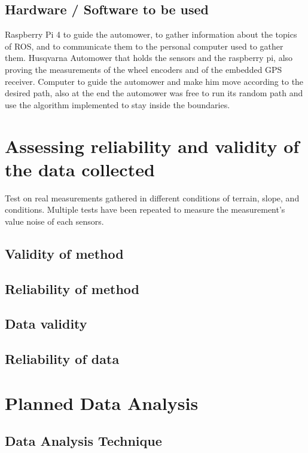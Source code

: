 \subsection{Hardware / Software to be used}
Raspberry Pi 4 to guide the automower, to gather information about the topics of ROS, and to communicate them to the personal computer used to gather them.
Husqvarna Automower that holds the sensors and the raspberry pi, also proving the measurements of the wheel encoders and of the embedded GPS receiver. 
Computer to guide the automower and make him move according to the desired path, also at the end the automower was free to run its random path and use the algorithm implemented to stay inside the boundaries.


\section{Assessing reliability and validity of the data collected}
\label{sec:assessingReliability}
Test on real measurements gathered in different conditions of terrain, slope, and conditions.
Multiple tests have been repeated to measure the measurement's value noise of each sensors.


\subsection{Validity of method}

\subsection{Reliability of method}

\subsection{Data validity}

\subsection{Reliability of data}


\section{Planned Data Analysis}
\label{sec:plannedDataAnalysis}

\subsection{Data Analysis Technique}

